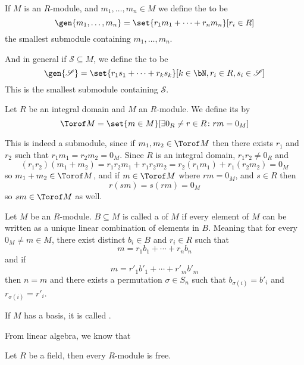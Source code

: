 \documentclass[10pt]{article}
\begin{document}
\begin{defn*}

    If $M$ is an $R$-module, and $m_1,\dots,m_n\in M$ we define the  to be
    \[ \gen{m_1,\dots,m_n} = \set{r_1m_1+\cdots+r_nm_n}[r_i\in R] \]
    the smallest submodule containing $m_1,\dots,m_n$.

    And in general if $\mathscr{S}\subseteq M$, we define the  to be
    \[ \gen{\mathscr S} = \set{r_1s_1+\cdots+r_ks_k}[k\in\bN, r_i\in R, s_i\in\mathscr S] \]
    This is the smallest submodule containing $\mathscr S$.

\end{defn*}

\begin{defn*}

    Let $R$ be an integral domain and $M$ an $R$-module.
    We define its  by
    \[ \Torof M = \set{m\in M}[\exists0_R\neq r\in R\colon rm=0_M] \]

\end{defn*}

This is indeed a submodule, since if $m_1,m_2\in\Torof M$ then there exists $r_1$ and $r_2$ such that $r_1m_1=r_2m_2=0_M$.
Since $R$ is an integral domain, $r_1r_2\neq0_R$ and
\[ (r_1r_2)(m_1+m_2) = r_1r_2m_1 + r_1r_2m_2 = r_2(r_1m_1) + r_1(r_2m_2) = 0_M \]
so $m_1+m_2\in\Torof M$, and if $m\in\Torof M$ where $rm=0_M$, and $s\in R$ then
\[ r(sm) = s(rm) = 0_M \]
so $sm\in\Torof M$ as well.

\begin{defn*}

    Let $M$ be an $R$-module.
    $B\subseteq M$ is called a  of $M$ if every element of $M$ can be written as a unique linear combination of elements in $B$.
    Meaning that for every $0_M\neq m\in M$, there exist distinct $b_i\in B$ and $r_i\in R$ such that
    \[ m = r_1b_1 + \cdots + r_nb_n \]
    and if
    \[ m = r'_1b'_1 + \cdots + r'_mb'_m \]
    then $n=m$ and there exists a permutation $\sigma\in S_n$ such that $b_{\sigma(i)}=b'_i$ and $r_{\sigma(i)}=r'_i$.

    If $M$ has a basis, it is called .

\end{defn*}

From linear algebra, we know that

\begin{thrm*}

    Let $R$ be a field, then every $R$-module is free.

\end{thrm*}
\end{document}
